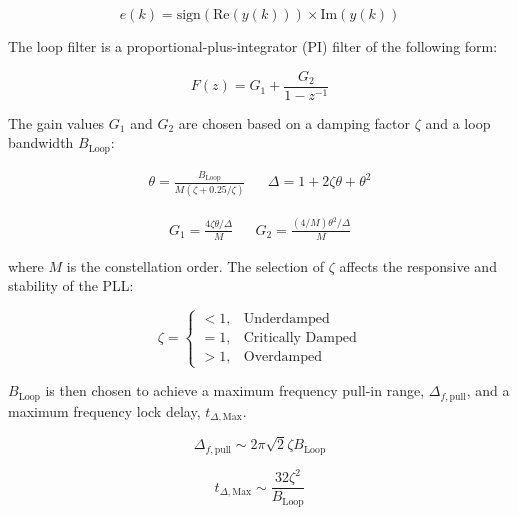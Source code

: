 \documentclass{article}
\begin{document}
\begin{equation}
e(k) = \text{sign}(\text{Re}(y(k))) \times \text{Im}(y(k))
\end{equation}

\noindent The loop filter is a proportional-plus-integrator (PI) filter of the following form:

\begin{equation}
F(z) = G_1 + \frac{G_2}{1-z^{-1}}
\end{equation}

\noindent The gain values $G_1$ and $G_2$ are chosen based on a damping factor $\zeta$ and a loop bandwidth $B_\text{Loop}$:

\begin{align}
	\theta = \frac{B_{\text{Loop}}}{M(\zeta + 0.25/\zeta)} && \Delta = 1 + 2\zeta\theta + \theta^2
\end{align}

\begin{align}
	G_1 = \frac{4\zeta\theta/\Delta}{M} && G_2 = \frac{(4/M)\theta^2/\Delta}{M}
\end{align}

\noindent where $M$ is the constellation order. The selection of $\zeta$ affects the responsive and stability of the PLL:

\begin{equation}
\zeta = \begin{cases}
< 1, & \text{Underdamped}\\
= 1, & \text{Critically Damped}\\
> 1, & \text{Overdamped}
\end{cases}
\end{equation}

\noindent $B_\text{Loop}$ is then chosen to achieve a maximum frequency pull-in range, $\Delta_{f,\text{pull}}$, and a maximum frequency lock delay, $t_{\Delta,\text{Max}}$.


\begin{equation}
	\label{eq::max_freq_correct}
	\Delta_{f,\text{pull}} \sim 2\pi\sqrt{2}\zeta{B_\text{Loop}}\end{equation}

\begin{equation}
	t_{\Delta,\text{Max}} \sim \frac{32\zeta^2}{B_\text{Loop}}\end{equation}
	
\end{document}
